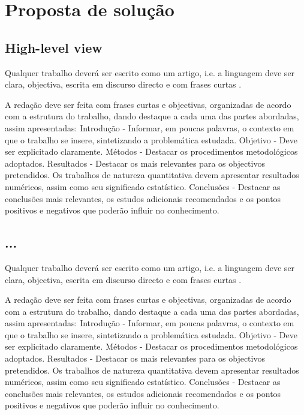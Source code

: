 % 
%  
%
\chapter{Proposta de solução}
\label{cha:ProposedWork}

\section{High-level view}
Qualquer trabalho deverá ser escrito como um artigo, i.e. a linguagem deve ser clara, objectiva, escrita em discurso directo e com frases curtas \cite{gustavii2016write, glasman2010science}.

A redação deve ser feita com frases curtas e objectivas, organizadas de acordo com a estrutura do trabalho, dando destaque a cada uma das partes abordadas, assim apresentadas: Introdução - Informar, em poucas palavras, o contexto em que o trabalho se insere, sintetizando a problemática estudada. Objetivo - Deve ser explicitado claramente. Métodos - Destacar os procedimentos metodológicos adoptados. Resultados - Destacar os mais relevantes para os objectivos pretendidos. Os trabalhos de natureza quantitativa devem apresentar resultados numéricos, assim como seu significado estatístico. Conclusões - Destacar as conclusões mais relevantes, os estudos adicionais recomendados e os pontos positivos e negativos que poderão influir no conhecimento. 


\section{...}
Qualquer trabalho deverá ser escrito como um artigo, i.e. a linguagem deve ser clara, objectiva, escrita em discurso directo e com frases curtas \cite{gustavii2016write, glasman2010science}.

A redação deve ser feita com frases curtas e objectivas, organizadas de acordo com a estrutura do trabalho, dando destaque a cada uma das partes abordadas, assim apresentadas: Introdução - Informar, em poucas palavras, o contexto em que o trabalho se insere, sintetizando a problemática estudada. Objetivo - Deve ser explicitado claramente. Métodos - Destacar os procedimentos metodológicos adoptados. Resultados - Destacar os mais relevantes para os objectivos pretendidos. Os trabalhos de natureza quantitativa devem apresentar resultados numéricos, assim como seu significado estatístico. Conclusões - Destacar as conclusões mais relevantes, os estudos adicionais recomendados e os pontos positivos e negativos que poderão influir no conhecimento.

